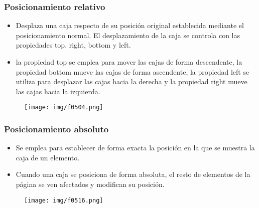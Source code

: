 
\begin{frame}
\frametitle{Posicionamiento relativo}

\begin{itemize}
  \item Desplaza una caja respecto de su posición original establecida mediante el posicionamiento normal. El desplazamiento de la caja se controla con las propiedades top, right, bottom y left.
  \item la propiedad top se emplea para mover las cajas de forma descendente, la propiedad bottom mueve las cajas de forma ascendente, la propiedad left se utiliza para desplazar las cajas hacia la derecha y la propiedad right mueve las cajas hacia la izquierda. 
\end{itemize}

\begin{center}
\begin{figure}[p]
\texttt{[image: img/f0504.png]}
\end{figure}
\end{center}

\end{frame}



\begin{frame}
\frametitle{Posicionamiento absoluto}

\begin{itemize}
  \item Se emplea para establecer de forma exacta la posición en la que se muestra la caja de un elemento. 
  \item Cuando una caja se posiciona de forma absoluta, el resto de elementos de la página se ven afectados y modifican su posición. 
\end{itemize}

\begin{center}
\begin{figure}[p]
\texttt{[image: img/f0516.png]}
\end{figure}
\end{center}

\end{frame}



